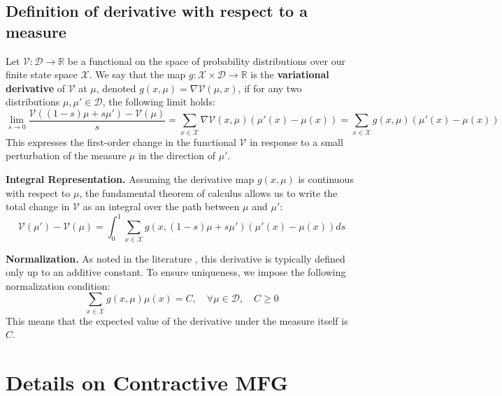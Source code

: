 \documentclass[10pt,twocolumn,letterpaper]{article}
\theoremstyle{definition}
\theoremstyle{remark}
\newcommand{\states}{\mathcal{X}}
\begin{document}
\subsection{Definition of derivative with respect to a measure}\label{app: functional_derivative}
Let $\mathcal V: \mathcal D \to \mathbb{R}$ be a functional on the space of probability distributions over our finite state space $\states$.
We say that the map $g: \states \times \mathcal D \to \mathbb{R}$ is the \textbf{variational derivative} of $\mathcal V$ at $\mu$, denoted $g(x, \mu) = {\nabla \mathcal V}(\mu, x)$, if for any two distributions $\mu, \mu' \in \mathcal D$, the following limit holds:
\[
\lim_{s \to 0} \frac{\mathcal V((1-s)\mu + s\mu') - \mathcal V(\mu)}{s} = \sum_{x \in \states} \nabla \mathcal V(x, \mu) \left( \mu'(x) - \mu(x) \right) = \sum_{x \in \states} g(x, \mu) \left( \mu'(x) - \mu(x) \right)
\]
This expresses the first-order change in the functional $\mathcal V$ in response to a small perturbation of the measure $\mu$ in the direction of $\mu'$.

\noindent\textbf{Integral Representation.} 
Assuming the derivative map $g(x, \mu)$ is continuous with respect to $\mu$, the fundamental theorem of calculus allows us to write the total change in $\mathcal V$ as an integral over the path between $\mu$ and $\mu'$:
\[
\mathcal V(\mu') - \mathcal V(\mu) = \int_0^1 \sum_{x \in \states} g(x, (1-s)\mu + s\mu') \left( \mu'(x) - \mu(x) \right) ds
\]

\noindent\textbf{Normalization.} 
As noted in the literature \citep{cardaliaguet2017learning}, this derivative is typically defined only up to an additive constant. To ensure uniqueness, we impose the following normalization condition:
\[
\sum_{x \in \states} g(x, \mu) \mu(x) = C, \quad \forall \mu \in \mathcal D, \quad C\ge 0
\]
This means that the expected value of the derivative under the measure itself is $C$.















\section{Details on Contractive MFG} 
\end{document}
